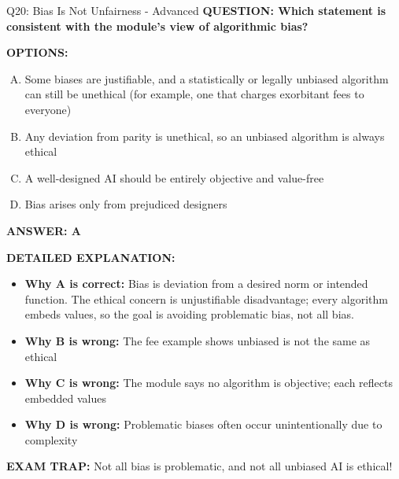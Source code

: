 \documentclass[8pt]{beamer}
\begin{document}
\begin{frame}[shrink=6]{Q20: Bias Is Not Unfairness - Advanced}
\fontsize{6.5}{7.5}\selectfont
\textbf{QUESTION: Which statement is consistent with the module's view of algorithmic bias?}

\vspace{0.1cm}
\textbf{OPTIONS:}
\begin{enumerate}[A.]
\item Some biases are justifiable, and a statistically or legally unbiased algorithm can still be unethical (for example, one that charges exorbitant fees to everyone)
\item Any deviation from parity is unethical, so an unbiased algorithm is always ethical
\item A well-designed AI should be entirely objective and value-free
\item Bias arises only from prejudiced designers
\end{enumerate}

\vspace{0.1cm}
\textcolor{myblue}{\textbf{ANSWER: A}}

\vspace{0.1cm}
\textbf{DETAILED EXPLANATION:}
\begin{itemize}
\item \textbf{Why A is correct:} Bias is deviation from a desired norm or intended function. The ethical concern is unjustifiable disadvantage; every algorithm embeds values, so the goal is avoiding problematic bias, not all bias.
\item \textbf{Why B is wrong:} The fee example shows unbiased is not the same as ethical
\item \textbf{Why C is wrong:} The module says no algorithm is objective; each reflects embedded values
\item \textbf{Why D is wrong:} Problematic biases often occur unintentionally due to complexity
\end{itemize}

\textcolor{myred}{\textbf{EXAM TRAP:}} Not all bias is problematic, and not all unbiased AI is ethical!
\end{frame}
\end{document}
